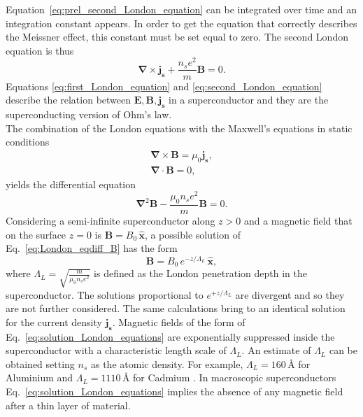 \documentclass[../main/main.tex]{subfiles}
\begin{document}
Equation~\eqref{eq:prel_second_London_equation} can be integrated over time and an integration constant appears. In order to get the equation that correctly describes the Meissner effect, this constant must be set equal to zero. The second London equation is thus
\begin{equation} \label{eq:second_London_equation}
      \boldsymbol{\nabla}  \times \boldsymbol{j_s} + \frac{n_s e^2}{m} \boldsymbol{B} = 0.
\end{equation}
Equations \eqref{eq:first_London_equation} and \eqref{eq:second_London_equation} describe the relation between $\boldsymbol{E},\boldsymbol{B},\boldsymbol{j_s}$ in a superconductor and they are the superconducting version of Ohm's law.\\
The combination of the London equations with the Maxwell's equations in static conditions
\begin{gather} 
    \boldsymbol{\nabla}  \times \boldsymbol{B} = \mu_0 \boldsymbol{j_s} \label{eq:Maxw_curlB}, \\
    \boldsymbol{\nabla}  \cdot \boldsymbol{B} = 0, \label{eq:Maxw_divB}
\end{gather}
yields the differential equation
\begin{equation} \label{eq:London_eqdiff_B}
    \boldsymbol{\nabla}^2  \boldsymbol{B} -\frac{\mu_0 n_s e^2}{m} \boldsymbol{B} = 0.
\end{equation}
Considering a semi-infinite superconductor along $z>0$ and a magnetic field that on the surface $z=0$ is $\boldsymbol{B} = B_{0}\, \hat{\boldsymbol{x}}$, a possible solution of Eq.~\eqref{eq:London_eqdiff_B} has the form 
\begin{equation} \label{eq:solution_London_equations}
    \boldsymbol{B} = B_{0}\, e^{-z/\Lambda_L}\, \hat{\boldsymbol{x}},
\end{equation}
where $\Lambda_L = \sqrt{\frac{m}{\mu_0 n_s e^2}}$ is defined as the London penetration depth in the superconductor. The solutions proportional to $e^{+z/\Lambda_L}$ are divergent and so they are not further considered. The same calculations bring to an identical solution for the current density $\boldsymbol{j_s}$. Magnetic fields of the form of Eq.~\eqref{eq:solution_London_equations} are exponentially suppressed inside the superconductor with a characteristic length scale of $\Lambda_L$. An estimate of $\Lambda_L$ can be obtained setting $n_s$ as the atomic density. For example, $\Lambda_L=160\, \text{\AA}$ for Aluminium and  $\Lambda_L=1110\, \text{\AA}$ for Cadmium \cite{meservey2018equilibrium}. In macroscopic superconductors Eq.~\eqref{eq:solution_London_equations} implies the absence of any magnetic field after a thin layer of material.
\end{document}
